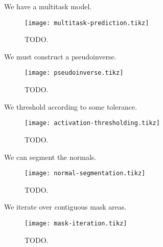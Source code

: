 We have a multitask model.

\begin{figure}[H]
  \centering
  \texttt{[image: multitask-prediction.tikz]}
  \caption{TODO.}
\end{figure}

We must construct a pseudoinverse.

\begin{figure}[H]
  \centering
  \texttt{[image: pseudoinverse.tikz]}
  \caption{TODO.}
\end{figure}

We threshold according to some tolerance.

\begin{figure}[H]
  \centering
  \texttt{[image: activation-thresholding.tikz]}
  \caption{TODO.}
\end{figure}

We can segment the normals.

\begin{figure}[H]
  \centering
  \texttt{[image: normal-segmentation.tikz]}
  \caption{TODO.}
\end{figure}

We iterate over contiguous mask areas.

\begin{figure}[H]
  \centering
  \texttt{[image: mask-iteration.tikz]}
  \caption{TODO.}
\end{figure}
